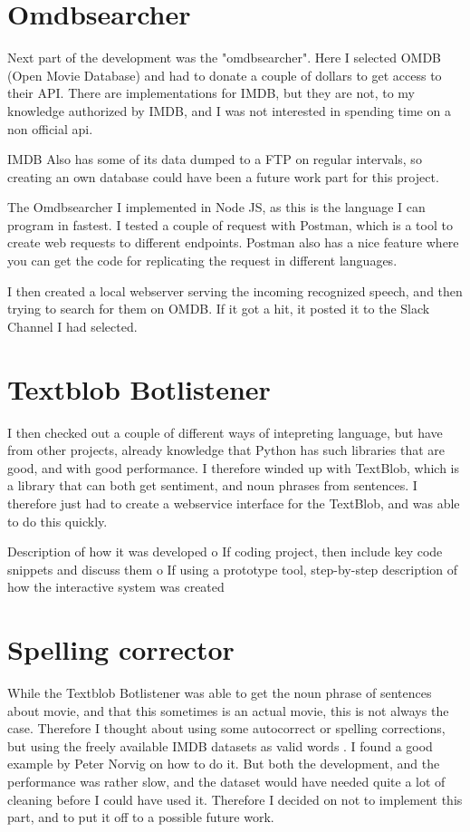 \documentclass[11pt,fleqn]{book} %
\begin{document}
\section{Omdbsearcher}
Next part of the development was the "omdbsearcher". Here I selected OMDB (Open Movie Database) and had to donate a couple of dollars to get access to their API. There are implementations for IMDB, but they are not, to my knowledge authorized by IMDB, and I was not interested in spending time on a non official api.

IMDB Also has some of its data dumped to a FTP on regular intervals, so creating an own database could have been a future work part for this project. \cite{IMDbAlternativeInterfaces}

The Omdbsearcher I implemented in Node JS, as this is the language I can program in fastest. I tested a couple of request with Postman, which is a tool to create web requests to different endpoints. Postman also has a nice feature where you can get the code for replicating the request in different languages.

I then created a local webserver serving the incoming recognized speech, and then trying to search for them on OMDB. If it got a hit, it posted it to the Slack Channel I had selected.

\section{Textblob Botlistener}
I then checked out a couple of different ways of intepreting language, but have from other projects, already knowledge that Python has such libraries that are good, and with good performance. I therefore winded up with TextBlob, which is a library that can both get sentiment, and noun phrases\cite{WikipediaNounPhrase} from sentences. \cite{TextBlobTutorial:Documentation} 
I therefore just had to create a webservice interface for the TextBlob, and was able to do this quickly.

Description of how it was developed
o	If coding project, then include key code snippets and discuss them
o	If using a prototype tool, step-by-step description of how the interactive system was created

\section{Spelling corrector}
While the Textblob Botlistener was able to get the noun phrase\cite{WikipediaNounPhrase} of sentences about movie, and that this sometimes is an actual movie, this is not always the case. Therefore I thought about using some autocorrect or spelling corrections, but using the freely available IMDB datasets as valid words \cite{IMDbAlternativeInterfaces}. I found a good example by Peter Norvig \cite{NorvigHowCorrector} on how to do it.
But both the development, and the performance was rather slow, and the dataset would have needed quite a lot of cleaning before I could have used it. Therefore I decided on not to implement this part, and to put it off to a possible future work.
\end{document}
